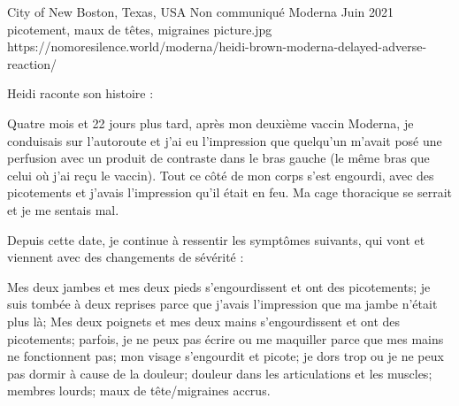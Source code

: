 {City of New Boston, Texas, USA}
{Non communiqué}
{Moderna}
{Juin 2021}
{picotement, maux de têtes, migraines}
{picture.jpg}
{https://nomoresilence.world/moderna/heidi-brown-moderna-delayed-adverse-reaction/}
{

Heidi raconte son histoire :

Quatre mois et 22 jours plus tard, après mon deuxième vaccin Moderna, je
conduisais sur l'autoroute et j'ai eu l'impression que quelqu'un m'avait posé
une perfusion avec un produit de contraste dans le bras gauche (le même bras que
celui où j'ai reçu le vaccin). Tout ce côté de mon corps s'est engourdi, avec
des picotements et j'avais l'impression qu'il était en feu. Ma cage thoracique
se serrait et je me sentais mal.

Depuis cette date, je continue à ressentir les symptômes suivants, qui vont et
viennent avec des changements de sévérité :

Mes deux jambes et mes deux pieds s'engourdissent et ont des picotements; je
suis tombée à deux reprises parce que j'avais l'impression que ma jambe n'était
plus là; Mes deux poignets et mes deux mains s'engourdissent et ont des
picotements; parfois, je ne peux pas écrire ou me maquiller parce que mes mains
ne fonctionnent pas; mon visage s'engourdit et picote; je dors trop ou je ne
peux pas dormir à cause de la douleur; douleur dans les articulations et les
muscles; membres lourds; maux de tête/migraines accrus.

}
